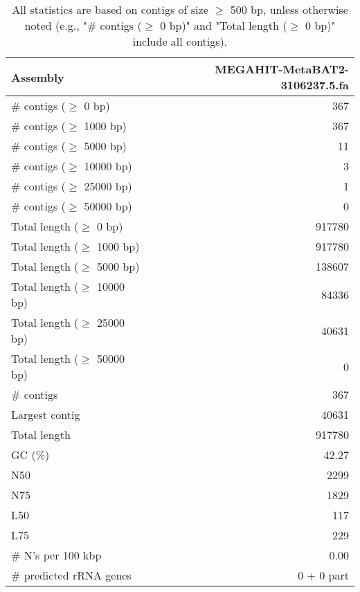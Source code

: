 \documentclass[12pt,a4paper]{article}
\begin{document}
\begin{table}[ht]
\begin{center}
\caption{All statistics are based on contigs of size $\geq$ 500 bp, unless otherwise noted (e.g., "\# contigs ($\geq$ 0 bp)" and "Total length ($\geq$ 0 bp)" include all contigs).}
\begin{tabular}{|l*{1}{|r}|}
\hline
Assembly & MEGAHIT-MetaBAT2-3106237.5.fa \\ \hline
\# contigs ($\geq$ 0 bp) & 367 \\ \hline
\# contigs ($\geq$ 1000 bp) & 367 \\ \hline
\# contigs ($\geq$ 5000 bp) & 11 \\ \hline
\# contigs ($\geq$ 10000 bp) & 3 \\ \hline
\# contigs ($\geq$ 25000 bp) & 1 \\ \hline
\# contigs ($\geq$ 50000 bp) & 0 \\ \hline
Total length ($\geq$ 0 bp) & 917780 \\ \hline
Total length ($\geq$ 1000 bp) & 917780 \\ \hline
Total length ($\geq$ 5000 bp) & 138607 \\ \hline
Total length ($\geq$ 10000 bp) & 84336 \\ \hline
Total length ($\geq$ 25000 bp) & 40631 \\ \hline
Total length ($\geq$ 50000 bp) & 0 \\ \hline
\# contigs & 367 \\ \hline
Largest contig & 40631 \\ \hline
Total length & 917780 \\ \hline
GC (\%) & 42.27 \\ \hline
N50 & 2299 \\ \hline
N75 & 1829 \\ \hline
L50 & 117 \\ \hline
L75 & 229 \\ \hline
\# N's per 100 kbp & 0.00 \\ \hline
\# predicted rRNA genes & 0 + 0 part \\ \hline
\end{tabular}
\end{center}
\end{table}
\end{document}
